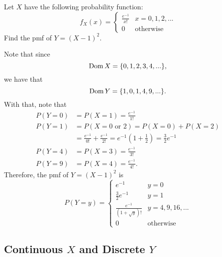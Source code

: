 \documentclass[notoc,notitlepage]{tufte-book}
\begin{document}
\begin{ex}
  Let $X$ have the following probability function:
  \begin{equation*}
    f_X (x) = \begin{cases}
      \frac{e^{-1}}{x!} & x = 0, 1, 2, ... \\
      0                 & \text{otherwise}
    \end{cases}
  \end{equation*}
  Find the pmf of $Y = (X - 1)^2$.
  
  \begin{solution}
    Note that since
    \begin{equation*}
      \operatorname{Dom} X = \{0, 1, 2, 3, 4, ...\},
    \end{equation*}
    we have that
    \begin{equation*}
      \operatorname{Dom} Y = \{1, 0, 1, 4, 9, ...\}.
    \end{equation*}
    With that, note that
    \begin{align*}
      P(Y = 0) &= P(X = 1) = \frac{e^{-1}}{1!} \\
      P(Y = 1) &= P(X = 0 \text{ or } 2) = P(X = 0) + P(X = 2) \\
               &= \frac{e^{-1}}{0!} + \frac{e^{-1}}{2!}
                = e^{-1} \left( 1 + \frac{1}{2} \right) = \frac{3}{2} e^{-1} \\
      P(Y = 4) &= P(X = 3) = \frac{e^{-1}}{3!} \\
      P(Y = 9) &= P(X = 4) = \frac{e^{-1}}{4!}.
    \end{align*}
    Therefore, the pmf of $Y = (X - 1)^2$ is
    \begin{equation*}
      P(Y = y) = \begin{cases}
        e^{-1}                         & y = 0 \\
        \frac{3}{2} e^{-1}             & y = 1 \\
        \frac{e^{-1}}{(1 + \sqrt{y})!} & y = 4, 9, 16, ... \\
        0                              & \text{otherwise}
      \end{cases}
    \end{equation*}
  \end{solution}
\end{ex}


\subsection{Continuous $X$ and Discrete $Y$}%
\label{sub:continuous_x_and_discrete_y}
\end{document}
